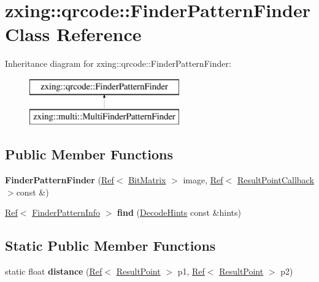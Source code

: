 \hypertarget{classzxing_1_1qrcode_1_1_finder_pattern_finder}{}\section{zxing\+:\+:qrcode\+:\+:Finder\+Pattern\+Finder Class Reference}
\label{classzxing_1_1qrcode_1_1_finder_pattern_finder}
Inheritance diagram for zxing\+:\+:qrcode\+:\+:Finder\+Pattern\+Finder\+:\begin{figure}[H]
\begin{center}
\leavevmode
\includegraphics[height=2.000000cm]{classzxing_1_1qrcode_1_1_finder_pattern_finder}
\end{center}
\end{figure}
\subsection*{Public Member Functions}
\begin{DoxyCompactItemize}
\item 
\mbox{\label{classzxing_1_1qrcode_1_1_finder_pattern_finder_a5ed564a767fc4424913484ab1896cf29}} 
{\bfseries Finder\+Pattern\+Finder} (\mbox{\hyperlink{classzxing_1_1_ref}{Ref}}$<$ \mbox{\hyperlink{classzxing_1_1_bit_matrix}{Bit\+Matrix}} $>$ image, \mbox{\hyperlink{classzxing_1_1_ref}{Ref}}$<$ \mbox{\hyperlink{classzxing_1_1_result_point_callback}{Result\+Point\+Callback}} $>$const \&)
\item 
\mbox{\label{classzxing_1_1qrcode_1_1_finder_pattern_finder_aa8f9934fae3ac815d836cf9ba5aa1b72}} 
\mbox{\hyperlink{classzxing_1_1_ref}{Ref}}$<$ \mbox{\hyperlink{classzxing_1_1qrcode_1_1_finder_pattern_info}{Finder\+Pattern\+Info}} $>$ {\bfseries find} (\mbox{\hyperlink{classzxing_1_1_decode_hints}{Decode\+Hints}} const \&hints)
\end{DoxyCompactItemize}
\subsection*{Static Public Member Functions}
\begin{DoxyCompactItemize}
\item 
\mbox{\label{classzxing_1_1qrcode_1_1_finder_pattern_finder_ad924adf636f3f524d9dd4407974479eb}} 
static float {\bfseries distance} (\mbox{\hyperlink{classzxing_1_1_ref}{Ref}}$<$ \mbox{\hyperlink{classzxing_1_1_result_point}{Result\+Point}} $>$ p1, \mbox{\hyperlink{classzxing_1_1_ref}{Ref}}$<$ \mbox{\hyperlink{classzxing_1_1_result_point}{Result\+Point}} $>$ p2)
\end{DoxyCompactItemize}
